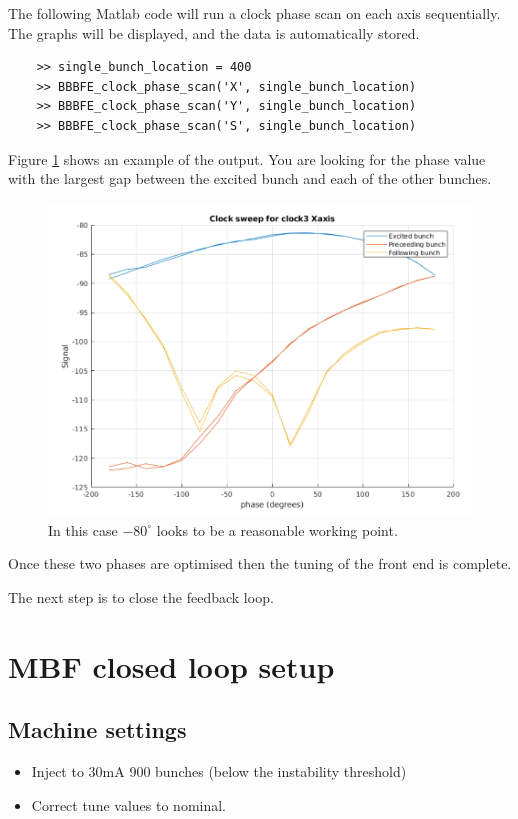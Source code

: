 \documentclass{report}
\begin{document}
The following Matlab code will run a clock phase scan on each axis sequentially. The graphs will be displayed, and the data is automatically stored. 

\begin{verbatim}
    >> single_bunch_location = 400
    >> BBBFE_clock_phase_scan('X', single_bunch_location)
    >> BBBFE_clock_phase_scan('Y', single_bunch_location)
    >> BBBFE_clock_phase_scan('S', single_bunch_location)
\end{verbatim}
Figure \ref{fig:frontend_clock_phase_scan} shows an example of the output. You are looking for the phase value with the largest gap between the excited bunch and each of the other bunches. 

\begin{figure}[ht]
    \centering
    \includegraphics[width=0.8\linewidth]{clock_sweep.png}
    \caption{In this case $-80^\circ$ looks to be a reasonable working point. }
    \label{fig:frontend_clock_phase_scan}
\end{figure}
  
Once these two phases are optimised then the tuning of the front end is complete.

The next step is to close the feedback loop.
\clearpage
\section{MBF closed loop setup}

\subsection{Machine settings}
\begin{itemize}
    \item {Inject to 30mA 900 bunches (below the instability threshold)}
    \item{Correct tune values to nominal.}
\end{itemize}
\end{document}
